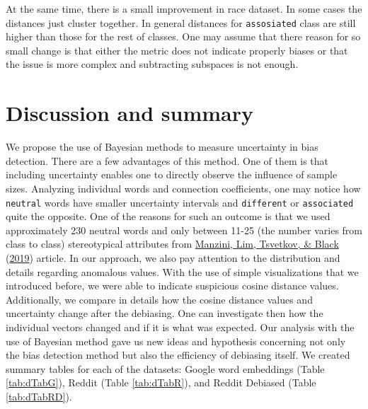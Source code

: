 \documentclass[
  12pt,
]{book}
\begin{document}
At the same time, there is a small improvement in race dataset. In some cases the distances just cluster together. In general distances for \texttt{assosiated} class are still higher than those for the rest of classes. One may assume that there reason for so small change is that either the metric does not indicate properly biases or that the issue is more complex and subtracting subspaces is not enough.

\hypertarget{discussion-and-summary}{%
\chapter{Discussion and summary}\label{discussion-and-summary}}

We propose the use of Bayesian methods to measure uncertainty in bias detection. There are a few advantages of this method. One of them is that including uncertainty enables one to directly observe the influence of sample sizes. Analyzing individual words and connection coefficients, one may notice how \texttt{neutral} words have smaller uncertainty intervals and \texttt{different} or \texttt{associated} quite the opposite. One of the reasons for such an outcome is that we used approximately 230 neutral words and only between 11-25 (the number varies from class to class) stereotypical attributes from \protect\hyperlink{ref-Manzini2019blackToCriminal}{Manzini, Lim, Tsvetkov, \& Black} (\protect\hyperlink{ref-Manzini2019blackToCriminal}{2019}) article. In our approach, we also pay attention to the distribution and details regarding anomalous values. With the use of simple visualizations that we introduced before, we were able to indicate suspicious cosine distance values. Additionally, we compare in details how the cosine distance values and uncertainty change after the debiasing. One can investigate then how the individual vectors changed and if it is what was expected. Our analysis with the use of Bayesian method gave us new ideas and hypothesis concerning not only the bias detection method but also the efficiency of debiasing itself.
We created summary tables for each of the datasets: Google word embeddings (Table \ref{tab:dTabG}), Reddit (Table \ref{tab:dTabR}), and Reddit Debiased (Table \ref{tab:dTabRD}).
\end{document}
